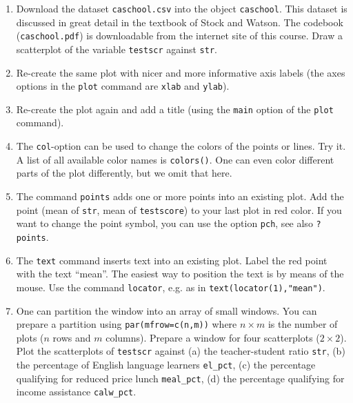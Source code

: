 \documentclass{article}
\begin{document}
\begin{enumerate}
\item Download the dataset \texttt{caschool.csv} into the object \texttt{caschool}. This dataset is discussed in great detail in the textbook of Stock and Watson. The codebook (\texttt{caschool.pdf}) is downloadable from the internet site of this course. Draw a scatterplot of the variable \texttt{testscr} against \texttt{str}.

\item Re-create the same plot with nicer and more informative axis labels (the axes options in the \texttt{plot} command are \texttt{xlab} and \texttt{ylab}).

\item Re-create the plot again and add a title (using the \texttt{main} option of the \texttt{plot} command).

\item The \texttt{col}-option can be used to change the colors of the points or lines. Try it. A list of all available color names is \texttt{colors()}. One can even color different parts of the plot differently, but we omit that here.

\item The command \texttt{points} adds one or more points into an existing plot. Add the point (mean of \texttt{str}, mean of \texttt{testscore}) to your last plot in red color. If you want to change the point symbol, you can use the option \texttt{pch}, see also \texttt{?points}.

\item The \texttt{text} command inserts text into an existing plot. Label the red point with the text \textquotedblleft mean\textquotedblright . The easiest way to position the text is by means of the mouse. Use the command \texttt{locator}, e.g. as in \texttt{text(locator(1),"mean")}.

\item \label{streudiagr}One can partition the window into an array of small windows. You can prepare a partition using \texttt{par(mfrow=c(n,m))} where $n\times m$ is the number of plots ($n$ rows and $m$ columns). Prepare a window for four scatterplots ($2\times 2$). Plot the scatterplots of \texttt{testscr} against (a) the teacher-student ratio \texttt{str}, (b) the percentage of English language learners \texttt{el\_pct}, (c) the percentage qualifying for reduced price lunch \texttt{meal\_pct}, (d) the percentage qualifying for income assistance \texttt{calw\_pct}.
\end{enumerate}
\end{document}
